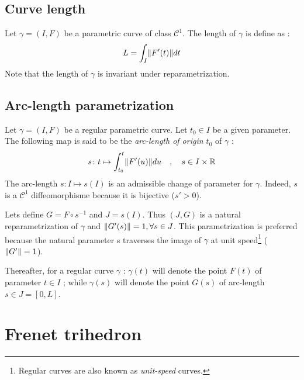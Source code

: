 \subsection{Curve length}
Let $\gamma=(I,F)$ be a parametric curve of class ${\mathcal{C}}^{1}$. The length of $\gamma$ is define as :
\begin{equation}
	L=\int_{I}\lVert F'(t)\rVert dt
\end{equation}
Note that the length of $\gamma$ is invariant under reparametrization.

\subsection{Arc-length parametrization}
Let $\gamma=(I,F)$ be a regular parametric curve. Let $t_0 \in I$ be a given parameter. The following map is said to be the \emph{arc-length of origin $t_0$} of $\gamma$ :
\begin{equation}
	s \colon t \mapsto \int_{t_{0}}^{t}\lVert F'(u)\rVert du
	\quad,\quad
	s \in I \times \mathbb{R}
\end{equation}
The arc-length $s \colon I\mapsto s(I)$ is an admissible change of parameter for $\gamma$. Indeed, $s$ is a ${\mathcal{C}}^{1}$ diffeomorphisme because it is bijective ($s'>0$).

Lets define $G=F\circ s^{-1}$ and $J=s(I)$. Thus $(J,G)$ is a natural reparametrization of $\gamma$ and  $\lVert G'(s)\rVert = 1, \forall s \in J$. This parametrization is preferred because the natural parameter s traverses the image of $\gamma$ at unit speed\footnote{Regular curves are also known as \emph{unit-speed} curves.} ($\lVert G'\rVert = 1$).

Thereafter, for a regular curve $\gamma$ : $\gamma(t)$ will denote the point $F(t)$ of parameter $t \in I$ ; while $\gamma(s)$ will denote the point $G(s)$ of arc-length $s \in J=[0,L]$.


\section{Frenet trihedron}\label{sec:frenettrihedron}


